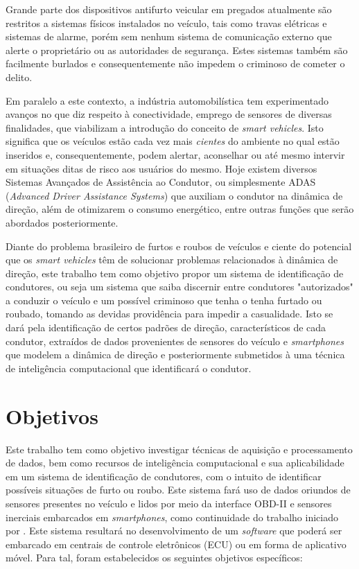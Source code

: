 Grande parte dos dispositivos antifurto veicular em pregados atualmente são restritos a sistemas físicos instalados no veículo, tais como travas elétricas e sistemas de alarme, porém sem nenhum sistema de comunicação externo que alerte o proprietário ou as autoridades de segurança. Estes sistemas também são facilmente burlados e consequentemente não impedem o criminoso de cometer o delito.

Em paralelo a este contexto, a indústria automobilística tem experimentado avanços no que diz respeito à conectividade, emprego de sensores de diversas finalidades, que viabilizam a introdução do conceito de \textit{smart vehicles}. Isto significa que os veículos estão cada vez mais \textit{cientes} do ambiente no qual estão inseridos e, consequentemente, podem alertar, aconselhar ou até mesmo intervir em situações ditas de risco aos usuários do mesmo. Hoje existem diversos Sistemas Avançados de Assistência ao Condutor, ou simplesmente ADAS (\textit{Advanced Driver Assistance Systems}) que auxiliam o condutor na dinâmica de direção, além de otimizarem o consumo energético, entre outras funções que serão abordados posteriormente.

Diante do problema brasileiro de furtos e roubos de veículos e ciente do potencial que os \textit{smart vehicles} têm de solucionar problemas relacionados à dinâmica de direção, este trabalho tem como objetivo propor um sistema de identificação de condutores, ou seja um sistema que saiba discernir entre condutores "autorizados" a conduzir o veículo e um possível criminoso que tenha o tenha furtado ou roubado, tomando as devidas providência para impedir a casualidade. Isto se dará pela identificação de certos padrões de direção, característicos de cada condutor, extraídos de dados provenientes de sensores do veículo e \textit{smartphones} que modelem a dinâmica de direção e posteriormente submetidos à uma técnica de inteligência computacional que identificará o condutor.

\section{Objetivos}

Este trabalho tem como objetivo investigar técnicas de aquisição e processamento de dados, bem como recursos de inteligência computacional e sua aplicabilidade em um sistema de identificação de condutores, com o intuito de identificar possíveis situações de furto ou roubo. Este sistema fará uso de dados oriundos de sensores presentes no veículo e lidos por meio da interface OBD-II e sensores inerciais embarcados em \textit{smartphones}, como continuidade do trabalho iniciado por . Este sistema resultará no desenvolvimento de um \textit{software} que poderá ser embarcado em centrais de controle eletrônicos (ECU) ou em forma de aplicativo móvel. Para tal, foram estabelecidos os seguintes objetivos específicos:

